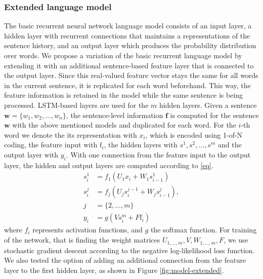 \documentclass[a4paper]{article}
\begin{document}
\subsubsection{Extended language model}
The basic recurrent neural network language model consists of an input layer, a hidden layer with recurrent connections that maintains a representations of the sentence history, and an output layer which produces the probability distribution over words.
We propose a variation of the basic recurrent language model by extending it with an additional sentence-based feature layer that is connected to the output layer. Since this real-valued feature vector stays the same for all words in the current sentence, it is replicated for each word beforehand. This way, the feature information is retained in the model while the same sentence is being processed.
LSTM-based layers are used for the $m$ hidden layers.
Given a sentence $\textbf{w} = \{w_1, w_2, \ldots, w_n\}$, the sentence-level information $\textbf{f}$ is computed for the sentence $\textbf{w}$ with the above mentioned models and duplicated for each word. For the $i$-th word we denote the its representation with $x_i$, which is encoded using 1-of-N coding, the feature input with $\text{f}_i$, the hidden layers with $s^1, s^2, \dots, s^m$ and the output layer with $y_i$. With one connection from the feature input to the output layer, the hidden and output layers are computed according to \eqref{eq}.
\begin{equation}
\label{eq}
\begin{aligned}
s^1_i &= f_1(U_1x_i + W_1s^1_{i-1}) \\
s^j_i &= f_j(U_js^{j-1}_i + W_js^j_{i-1}), \\j &= \{2,\ldots,m\} \\
y_i &= g(Vs^m_i + F\text{f}_i)
\end{aligned}
\end{equation}
where $f_i$ represents activation functions, and $g$ the softmax function.
For training of the network, that is finding the weight matrices $U_{1,\dots,m}, V, W_{1,\dots,m}, F$, we use stochastic gradient descent according to the negative log-likelihood loss function. We also tested the option of adding an additional connection from the feature layer to the first hidden layer, as shown in Figure \ref{fig:model-extended}.
\end{document}
